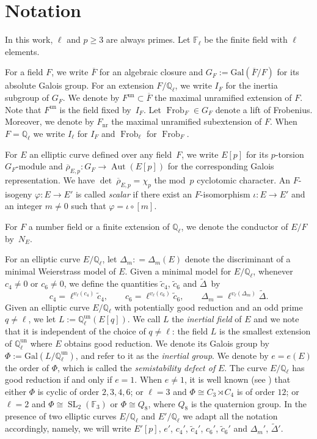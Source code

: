 \documentclass[12pt]{amsart}
\numberwithin{equation}{section}
\theoremstyle{definition}
\newcommand{\F}{\mathbb{F}}
\newcommand{\Q}{\mathbb{Q}}
\newcommand{\rhobar}{{\overline{\rho}}}
\newcommand{\Gal}{\text{Gal}}
\newcommand{\Qun}{\mathbb Q_\ell^{\text{un}}}
\DeclareMathOperator{\SL}{SL}
\DeclareMathOperator{\Frob}{Frob}
\DeclareMathOperator{\Aut}{Aut}
\DeclareMathOperator{\un}{un}
\begin{document}
\section{Notation} \label{s:notation}
\vspace{-2mm}
In this work, $\ell$ and $p \geq 3$ are always primes.
Let $\F_\ell$ be the finite field with $\ell$ elements.

For a field $F$, we write $\overline{F}$ for an algebraic
closure and $G_F := \Gal(\overline{F}/F)$ for its absolute Galois group. For an extension $F/\Q_\ell$, we write $I_F$ for the inertia subgroup of $G_F$. We denote by $F^{\un} \subset \overline{F}$
the maximal unramified extension of $F$. Note that $F^{\un}$ is the field fixed by~$I_F$. Let $\Frob_F \in G_F$ denote a lift of Frobenius. 
Moreover, we denote by $F_{\text{nr}}$ the maximal unramified subextension of $F$. 
When $F= \Q_\ell$ we write $I_\ell$ for $I_F$ and $\Frob_\ell$ for $\Frob_F$.

For $E$ an elliptic curve defined over any field~$F$, we write $E[p]$ for its $p$-torsion
$G_F$-module and $\rhobar_{E,p} : G_F \to \Aut(E[p])$ for the corresponding Galois representation. We have $\det\: \rhobar_{E,p} = \chi_p$ the mod~$p$ cyclotomic character.
An \(F\)-isogeny \(\varphi : E\to E'\) is called {\it scalar} if there
exist an \(F\)-isomorphism \(\iota\colon E\to E'\) and an integer
\(m\neq0\) such that $\varphi=\iota\circ[m]$.

For $F$ a number field or a finite extension of $\Q_\ell$, we denote the conductor of $E/F$ by~$N_E$.


For an elliptic curve $E/\Q_\ell$,
let $\Delta_m: = \Delta_m(E)$ denote the discriminant of a minimal Weierstrass model of $E$.
Given a minimal model for $E/\Q_\ell$, whenever $c_4 \neq 0$ or $c_6 \neq 0$,
we define the quantities $\tilde{c}_4$, $\tilde{c}_6$
and $\tilde{\Delta}$~by
\[
 c_4 = \ell^{v_\ell(c_4)} \tilde{c}_4, \qquad c_6 = \ell^{v_\ell(c_6)} \tilde{c}_6, \qquad \Delta_m = \ell^{v_\ell(\Delta_m)}\tilde{\Delta}.
\]
Given an elliptic curve $E/\Q_\ell$ with potentially good reduction 
and an odd prime $q\neq \ell$, we let $L:=\Qun(E[q])$.
We call $L$ the {\it inertial field} of $E$ and we note that it is independent of the choice of $q\neq \ell$:
the field $L$ is the smallest extension of $\Qun$ where
$E$ obtains good reduction. We denote its Galois group by 
$\Phi := \Gal(L/\Qun)$, and refer to it as the {\it inertial group}.
We denote by $e = e(E)$ the order of $\Phi$, which is called the {\it semistability defect of} $E$. 
The curve $E/\Q_\ell$ has good reduction if and only if $e=1$. When $e \neq 1$, it is well known (see \cite{Kraus}) that
either $\Phi$ is cyclic of order $2,3,4,6$; or $\ell=3$ and $\Phi\cong C_3 \rtimes C_4$ is of order $12$; or $\ell=2$ and $\Phi \cong \SL_2(\F_3)$ or $\Phi \cong Q_8$,  where $Q_8$ is the quaternion group.
In the presence of two elliptic curves
$E/\Q_\ell$ and $E'/\Q_\ell$ we adapt all the
notation accordingly, namely, we will write $E'[p]$, $e'$, $c_4'$, $\tilde{c}_4'$, $c_6'$, $\tilde{c}_6'$
and $\Delta_m'$, $\tilde{\Delta}'$.
\end{document}
